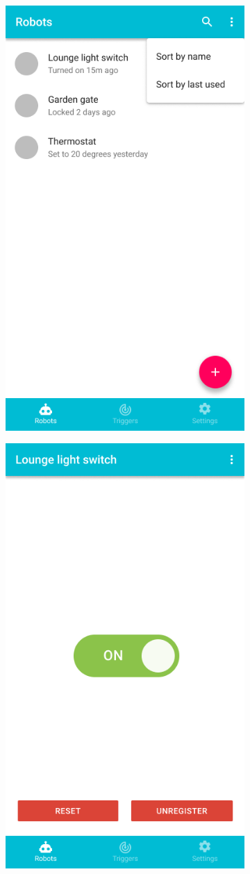 \documentclass[onecolumn]{IEEEtran}
\begin{document}
\begin{figure}[H]
\begin{subfigure}{.33\textwidth}
        \includegraphics[width=.7\linewidth]{images/app-2.png}
    \end{subfigure}
    \begin{subfigure}{.33\textwidth}
        \centering
        \includegraphics[width=.7\linewidth]{images/app-3.png}

\end{subfigure}
\end{figure}
\end{document}
